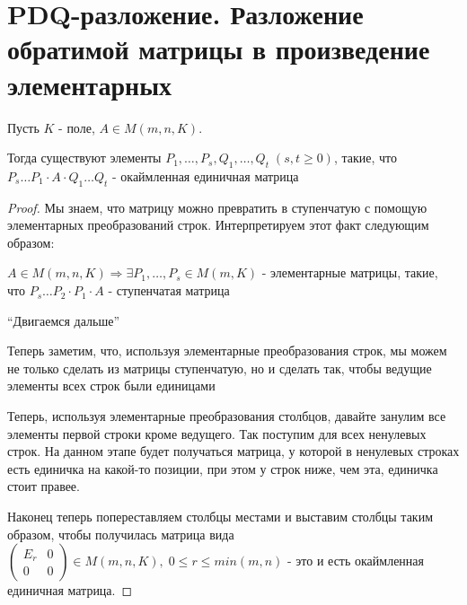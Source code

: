 \section{PDQ-разложение. Разложение обратимой матрицы в произведение элементарных}
\begin{theorem2}
    Пусть $K$ - поле, $A \in M(m, n, K)$.

    Тогда существуют элементы 
    $P_1, \dots, P_s, Q_1, \dots, Q_t \; (s,t \geqslant 0)$, такие, что 
    $P_s \dots P_1 \cdot A \cdot Q_1 \dots Q_t$ - окаймленная единичная матрица

    \begin{proof}
        Мы знаем, что матрицу можно превратить в ступенчатую с помощую элементарных преобразований строк.
        Интерпретируем этот факт следующим образом: 

        $A \in M(m, n, K) \Longrightarrow \exists P_1, \dots, P_s \in M(m, K)$ - элементарные матрицы, такие, что 
        $P_s \dots P_2 \cdot P_1 \cdot A$ - ступенчатая матрица

        ``Двигаемся дальше''

        Теперь заметим, что, используя элементарные преобразования строк, мы можем не только 
        сделать из матрицы ступенчатую, но и сделать так, чтобы ведущие элементы всех строк были единицами

        Теперь, используя элементарные преобразования столбцов, давайте занулим все элементы первой строки кроме 
        ведущего. Так поступим для всех ненулевых строк. На данном этапе будет получаться матрица,
        у которой в ненулевых строках есть единичка на какой-то позиции, при этом у строк ниже, чем эта, единичка стоит правее.

        Наконец теперь попереставляем столбцы местами и выставим столбцы таким образом, чтобы 
        получилась матрица вида
        $\begin{pmatrix}
            E_r & 0 \\
            0 & 0
        \end{pmatrix} \in M(m, n, K), \; 0 \leqslant r \leqslant min(m, n)$ - это и есть окаймленная 
        единичная матрица.
    \end{proof}
\end{theorem2}

